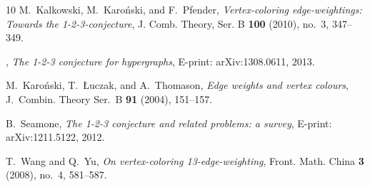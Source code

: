 \documentclass[12pt,reqno]{amsart}
\begin{document}
\begin{thebibliography}{10}
M.~Kalkowski, M.~Karo\'nski, and F.~Pfender, \emph{Vertex-coloring
  edge-weightings: Towards the 1-2-3-conjecture}, J. Comb. Theory, Ser. B
  \textbf{100} (2010), no.~3, 347--349.

\bysame, \emph{The 1-2-3 conjecture for hypergraphs}, E-print: arXiv:1308.0611,
  2013.

M.~Karo\'{n}ski, T.~{\L}uczak, and A.~Thomason, \emph{Edge weights and vertex
  colours}, J.~Combin. Theory Ser.~B \textbf{91} (2004), 151--157.

B.~Seamone, \emph{The 1-2-3 conjecture and related problems: a survey},
  E-print: arXiv:1211.5122, 2012.

T.~Wang and Q.~Yu, \emph{On vertex-coloring 13-edge-weighting}, Front. Math.
  China \textbf{3} (2008), no.~4, 581--587.

\end{thebibliography}
\end{document}
